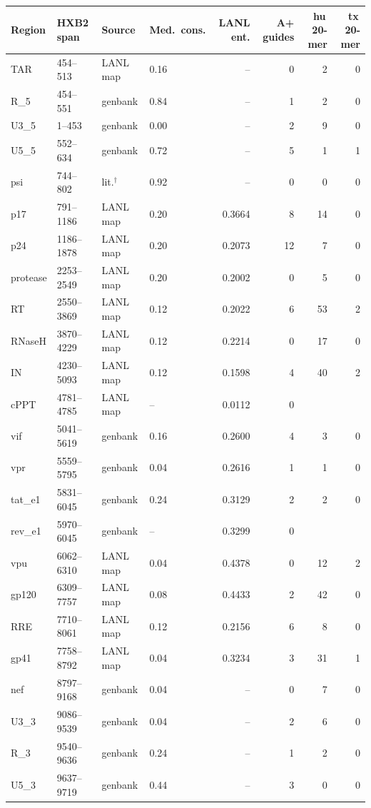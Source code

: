 \begin{tabular}{llllrrrr}
\toprule
Region & HXB2 span & Source & Med.\ cons. & LANL ent. & A+ guides & hu\,20-mer & tx\,20-mer \\
\midrule
TAR & 454--513 & LANL map & 0.16 & -- & 0 & 2 & 0 \\
R\_5 & 454--551 & genbank & 0.84 & -- & 1 & 2 & 0 \\
U3\_5 & 1--453 & genbank & 0.00 & -- & 2 & 9 & 0 \\
U5\_5 & 552--634 & genbank & 0.72 & -- & 5 & 1 & 1 \\
psi & 744--802 & lit.$^{\dagger}$ & 0.92 & -- & 0 & 0 & 0 \\
p17 & 791--1186 & LANL map & 0.20 & 0.3664 & 8 & 14 & 0 \\
p24 & 1186--1878 & LANL map & 0.20 & 0.2073 & 12 & 7 & 0 \\
protease & 2253--2549 & LANL map & 0.20 & 0.2002 & 0 & 5 & 0 \\
RT & 2550--3869 & LANL map & 0.12 & 0.2022 & 6 & 53 & 2 \\
RNaseH & 3870--4229 & LANL map & 0.12 & 0.2214 & 0 & 17 & 0 \\
IN & 4230--5093 & LANL map & 0.12 & 0.1598 & 4 & 40 & 2 \\
cPPT & 4781--4785 & LANL map & -- & 0.0112 & 0 &  &  \\
vif & 5041--5619 & genbank & 0.16 & 0.2600 & 4 & 3 & 0 \\
vpr & 5559--5795 & genbank & 0.04 & 0.2616 & 1 & 1 & 0 \\
tat\_e1 & 5831--6045 & genbank & 0.24 & 0.3129 & 2 & 2 & 0 \\
rev\_e1 & 5970--6045 & genbank & -- & 0.3299 & 0 &  &  \\
vpu & 6062--6310 & LANL map & 0.04 & 0.4378 & 0 & 12 & 2 \\
gp120 & 6309--7757 & LANL map & 0.08 & 0.4433 & 2 & 42 & 0 \\
RRE & 7710--8061 & LANL map & 0.12 & 0.2156 & 6 & 8 & 0 \\
gp41 & 7758--8792 & LANL map & 0.04 & 0.3234 & 3 & 31 & 1 \\
nef & 8797--9168 & genbank & 0.04 & -- & 0 & 7 & 0 \\
U3\_3 & 9086--9539 & genbank & 0.04 & -- & 2 & 6 & 0 \\
R\_3 & 9540--9636 & genbank & 0.24 & -- & 1 & 2 & 0 \\
U5\_3 & 9637--9719 & genbank & 0.44 & -- & 3 & 0 & 0 \\
\bottomrule
\end{tabular}
